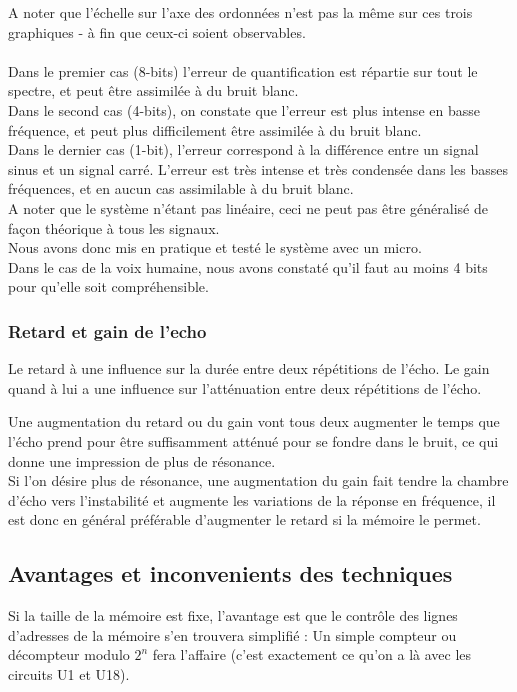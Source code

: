 \documentclass{article}
\begin{document}
A noter que l'échelle sur l'axe des ordonnées n'est pas la même sur ces trois graphiques - à fin que ceux-ci soient observables.\\
\\
Dans le premier cas (8-bits) l'erreur de quantification est répartie sur tout le spectre, et peut être assimilée à du bruit blanc.
\\
Dans le second cas (4-bits), on constate que l'erreur est plus intense en basse fréquence, et peut plus difficilement être assimilée à du bruit blanc.
\\
Dans le dernier cas (1-bit), l'erreur correspond à la différence entre un signal sinus et un signal carré. L'erreur est très intense et très condensée dans les basses fréquences, et en aucun cas assimilable à du bruit blanc.
\\

A noter que le système n'étant pas linéaire, ceci ne peut pas être généralisé de façon théorique à tous les signaux.\\

Nous avons donc mis en pratique et testé le système avec un micro.\\
Dans le cas de la voix humaine, nous avons constaté qu'il faut au moins 4 bits pour qu'elle soit compréhensible.

\subsubsection{Retard et gain de l'echo}
Le retard à une influence sur la durée entre deux répétitions de l'écho.
Le gain quand à lui a une influence sur l'atténuation entre deux répétitions de l'écho.

Une augmentation du retard ou du gain vont tous deux augmenter le temps que l'écho prend pour être suffisamment atténué pour se fondre dans le bruit, ce qui donne une impression de plus de résonance.\\

Si l'on désire plus de résonance, une augmentation du gain fait tendre la chambre d'écho vers l'instabilité et augmente les variations de la réponse en fréquence, il est donc en général préférable d'augmenter le retard si la mémoire le permet.

\subsection{Avantages et inconvenients des techniques}
Si la taille de la mémoire est fixe, l'avantage est que le contrôle des lignes d'adresses de la mémoire s'en trouvera simplifié : Un simple compteur ou décompteur modulo $2^n$ fera l'affaire (c'est exactement ce qu'on a là avec les circuits U1 et U18).
\end{document}
